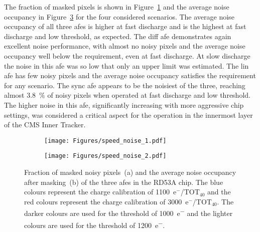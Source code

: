 The fraction of masked pixels is shown in Figure~\ref{fig:dt-noisy-pixels} and the average noise occupancy in Figure~\ref{fig:dt-noise-occ} for the four considered scenarios.
The average noise occupancy of all three \gls{afe}s is higher at fast discharge and is the highest at fast discharge and low threshold, as expected.
The \gls{diff} \gls{afe} demonstrates again excellent noise performance, with almost no noisy pixels and the average noise occupancy well below the requirement, even at fast discharge. At slow discharge the noise in this \gls{afe} was so low that only an upper limit was estimated. The \gls{lin} \gls{afe} has few noisy pixels and the average noise occupancy satisfies the requirement for any scenario. The \gls{sync} \gls{afe} appears to be the noisiest of the three, reaching almost \SI{3.8}{\percent} of noisy pixels when operated at fast discharge and low threshold. The higher noise in this \gls{afe}, significantly increasing with more aggressive chip settings, was considered a critical aspect for the operation in the innermost layer of the CMS Inner Tracker.

\begin{figure}[t]
    \centering
    \begin{subfigure}{0.49\textwidth}
        \centering
        \texttt{[image: Figures/speed\_noise\_1.pdf]}
        \caption{}
        \label{fig:dt-noisy-pixels}
    \end{subfigure}
    \hfill
    \begin{subfigure}{0.49\textwidth}
        \centering
        \texttt{[image: Figures/speed\_noise\_2.pdf]}
        \caption{}
        \label{fig:dt-noise-occ}
    \end{subfigure}
    \caption{Fraction of masked noisy pixels~(a) and the average noise occupancy after masking~(b) of the three \gls{afe}s in the RD53A chip. The blue colours represent the charge calibration of \num{1100}~e${^{-}}$/TOT$_{40}$ and the red colours represent the charge calibration of \num{3000}~e${^{-}}$/TOT$_{40}$. The darker colours are used for the threshold of \SI{1000}{e^-} and the lighter colours are used for the threshold of \SI{1200}{e^-}.}
\end{figure}